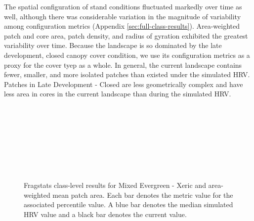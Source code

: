 The spatial configuration of stand conditions fluctuated markedly over time as well, although there was considerable variation in the magnitude of variability among configuration metrics (Appendix \ref{sec:full-class-results}). Area-weighted patch and core area, patch density, and radius of gyration exhibited the greatest variability over time. Because the landscape is so dominated by the late development, closed canopy cover condition, we use its configuration metrics as a proxy for the cover tyep as a whole. In general, the current landscape contains fewer, smaller, and more isolated patches than existed under the simulated HRV. Patches in Late Development - Closed are less geometrically complex and have less area in cores in the current landscape than during the simulated HRV. 

\begin{figure}[!htbp]
  \\%
  \\%
    \\%
    \\%
    \\%
    \\%
    \\%
  \caption{Fragstats class-level results for Mixed Evergreen - Xeric and area-weighted mean patch area. Each bar denotes the metric value for the associated percentile value. A blue bar denotes the median simulated HRV value and a black bar denotes the current value.}
  \label{fig:megx_areaam}
\end{figure}

